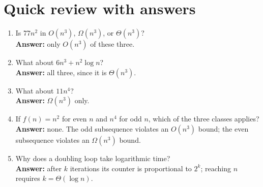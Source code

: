 \documentclass[11pt]{article}
\begin{document}
\section{Quick review with answers}
\begin{enumerate}
\item Is $77n^2$ in $O(n^3)$, $\Omega(n^3)$, or $\Theta(n^3)$?\\
\textbf{Answer:} only $O(n^3)$ of these three.
\item What about $6n^3+n^2\log n$?\\
\textbf{Answer:} all three, since it is $\Theta(n^3)$.
\item What about $11n^4$?\\
\textbf{Answer:} $\Omega(n^3)$ only.
\item If $f(n)=n^2$ for even $n$ and $n^4$ for odd $n$, which of the three classes applies?\\
\textbf{Answer:} none. The odd subsequence violates an $O(n^3)$ bound; the even subsequence violates an $\Omega(n^3)$ bound.
\item Why does a doubling loop take logarithmic time?\\
\textbf{Answer:} after $k$ iterations its counter is proportional to $2^k$; reaching $n$ requires $k=\Theta(\log n)$.
\end{enumerate}
\end{document}
